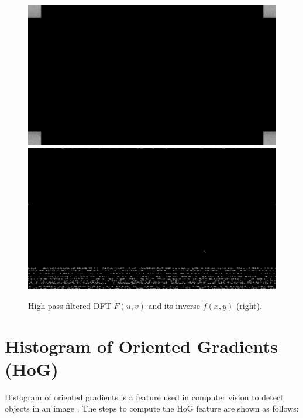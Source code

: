 \begin{figure}[H]
\includegraphics[scale=0.11]{images/pixv1-corn.png}
\includegraphics[scale=0.11]{images/pixv1.png}\\
\caption[Fourier transform on stuttering artifact]{High-pass filtered DFT $\widetilde{F}(u,v)$ and its inverse $\widetilde{f}(x,y)$ (right).}
\label{fig:fourier6}
\end{figure}


\section{Histogram of Oriented Gradients (HoG)}

Histogram of oriented gradients is a feature used in computer vision to detect objects in an image \cite{1467360}. The steps to compute the HoG feature are shown as follows:\\


